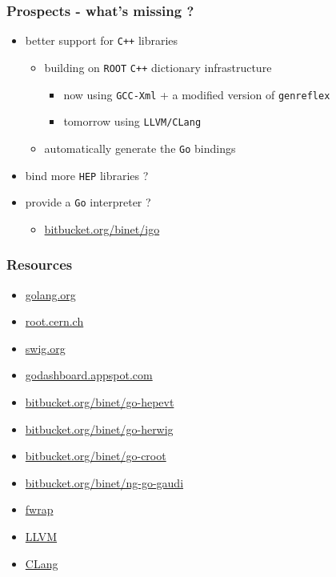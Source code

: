 \documentclass[bigger]{beamer}
\begin{document}
\begin{frame}
\frametitle{Prospects - what's missing ?}
\label{sec-1-27}


\begin{itemize}
\item better support for \verb~C++~ libraries
\begin{itemize}
\item building on \verb~ROOT~ \verb~C++~ dictionary infrastructure
\begin{itemize}
\item now using \verb~GCC-Xml~ + a modified version of \verb~genreflex~
\item tomorrow using \verb~LLVM/CLang~
\end{itemize}
\item automatically generate the \verb~Go~ bindings
\end{itemize}
\end{itemize}

\vspace

\begin{itemize}
\item bind more \verb~HEP~ libraries ?
\item provide a \verb~Go~ interpreter ?
\begin{itemize}
\item \href{http://bitbucket.org/binet/igo}{bitbucket.org/binet/igo}
\end{itemize}
\end{itemize}
\end{frame}
\begin{frame}
\frametitle{Resources}
\label{sec-1-28}


\begin{itemize}
\item \href{http://golang.org}{golang.org}
\item \href{http://root.cern.ch}{root.cern.ch}
\item \href{http://www.swig.org/}{swig.org}
\item \href{http://godashboard.appspot.com}{godashboard.appspot.com}
\item \href{http://bitbucket.org/binet/go-hepevt}{bitbucket.org/binet/go-hepevt}
\item \href{http://bitbucket.org/binet/go-herwig}{bitbucket.org/binet/go-herwig}
\item \href{http://bitbucket.org/binet/go-croot}{bitbucket.org/binet/go-croot}
\item \href{http://bitbucket.org/binet/ng-go-gaudi}{bitbucket.org/binet/ng-go-gaudi}
\item \href{http://fortrancython.wordpress.com/}{fwrap}
\item \href{http://llvm.org/}{LLVM}
\item \href{http://clang.llvm.org/}{CLang}
\end{itemize}
\end{frame}
\end{document}
